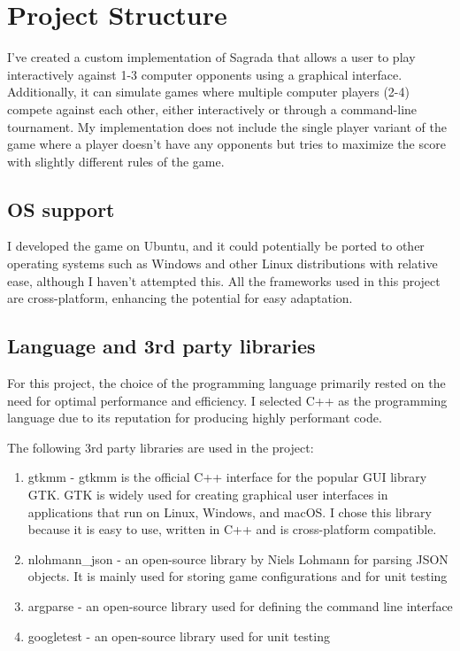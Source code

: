 \chapter{Project Structure}

I've created a custom implementation of Sagrada that allows a user to play interactively against 1-3 computer opponents using a graphical interface. 
Additionally, it can simulate games where multiple computer players (2-4) compete against each other, either interactively or through 
a command-line tournament. My implementation does not include the single player variant of the game where a player doesn't have any opponents
but tries to maximize the score with slightly different rules of the game.

\section{OS support}

I developed the game on Ubuntu, and it could potentially be ported to other operating systems such as Windows and other Linux distributions with relative ease, 
although I haven't attempted this. All the frameworks used in this project are cross-platform, enhancing the potential for easy adaptation.


\section{Language and 3rd party libraries}
For this project, the choice of the programming language primarily rested on the need for optimal performance and efficiency. 
I selected C++ as the programming language due to its reputation for producing highly performant code.

The following 3rd party libraries are used in the project:
\begin{enumerate}
    \item gtkmm - gtkmm \cite{gtkmm} is the official C++ interface for the popular GUI library GTK. GTK is widely used for creating graphical user interfaces 
    in applications that run on Linux, Windows, and macOS. I chose this library because it is easy to use, written in C++ and is cross-platform compatible.
    \item nlohmann\_json - an open-source library by Niels Lohmann \cite{nlohmann_json} for parsing JSON objects. It is mainly used for storing game configurations and for unit testing 
    \item argparse - an open-source library used for defining the command line interface \cite{argparse}
    \item googletest - an open-source library used for unit testing \cite{googletest}
\end{enumerate}

